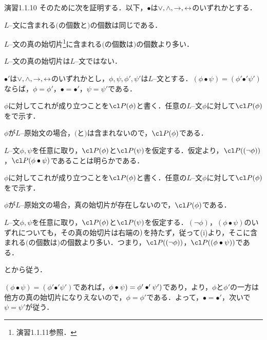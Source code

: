 \begin{excfield}{演習1.1.10}
  そのために次を証明する．以下，$\bullet$は$\lor, \land, \ra, \lra$のいずれかとする．
  \begin{lem}
    \begin{thmlist}[n]
      \item \label{i_1_10_lem_preq}
      $L$--文に含まれる$($の個数と$)$の個数は同じである．
      \item \label{i_1_10_lem_prg}
      $L$--文の真の始切片\footnote{演習1.1.11参照．}に含まれる$($の個数は$)$の個数より多い．
      \item \label{i_1_10_lem_iniseg}
      $L$--文の真の始切片は$L$--文ではない．
      \item \label{i_1_10_lem_conn}
      $\bullet'$は$\lor, \land , \ra, \lra$のいずれかとし，$\phi, \psi, \phi', \psi'$は$L$--文とする．$(\phi \bullet \psi) = (\phi' \mathbin{\bullet'} \psi')$ならば，$\phi = \phi'$，$\bullet = \bullet'$，$\psi = \psi'$である．
    \end{thmlist}

    \tcblower

    \begin{myenum}[n]
      \item $\phi$に対してこれが成り立つことを$\cl P (\phi)$と書く．任意の$L$--文$\phi$に対して$\cl P (\phi)$をで示す．
      \begin{step}
        \item $\phi$が$L$--原始文の場合，$($と$)$は含まれないので，$\cl P (\phi)$である．
        \item $L$--文$\phi, \psi$を任意に取り，$\cl P (\phi)$と$\cl P (\psi)$を仮定する．仮定より，$\cl P ((\lnot \phi))$，$\cl P (\phi \bullet \psi)$であることは明らかである．
      \end{step}
      \item $\phi$に対してこれが成り立つことを$\cl P (\phi)$と書く．任意の$L$--文$\phi$に対して$\cl P (\phi)$をで示す．
      \begin{step}
        \item $\phi$が$L$--原始文の場合，真の始切片が存在しないので，$\cl P (\phi)$である．
        \item $L$--文$\phi, \psi$を任意に取り，$\cl P (\phi)$と$\cl P (\psi)$を仮定する．$(\lnot \phi)$，$(\phi \bullet \psi)$のいずれについても，その真の始切片は右端の$\noprint{(})$を持たず，従って(i)より，そこに含まれる$($の個数は$)$の個数より多い．つまり，$\cl P ((\lnot \phi))$，$\cl P ((\phi \bullet \psi))$である．
      \end{step}
      \item {}とから従う．
      \item $(\phi \bullet \psi) = (\phi' \mathbin{\bullet'} \psi')$であれば，$\noprint{(}\phi \bullet \psi) = \noprint{(}\phi' \mathbin{\bullet'} \psi')$であり，より，$\phi$と$\phi'$の一方は他方の真の始切片になりえないので，$\phi = \phi'$である．よって，$\bullet = \bullet'$，次いで$\psi = \psi'$が従う．
    \end{myenum}
  \end{lem}


\end{excfield}
